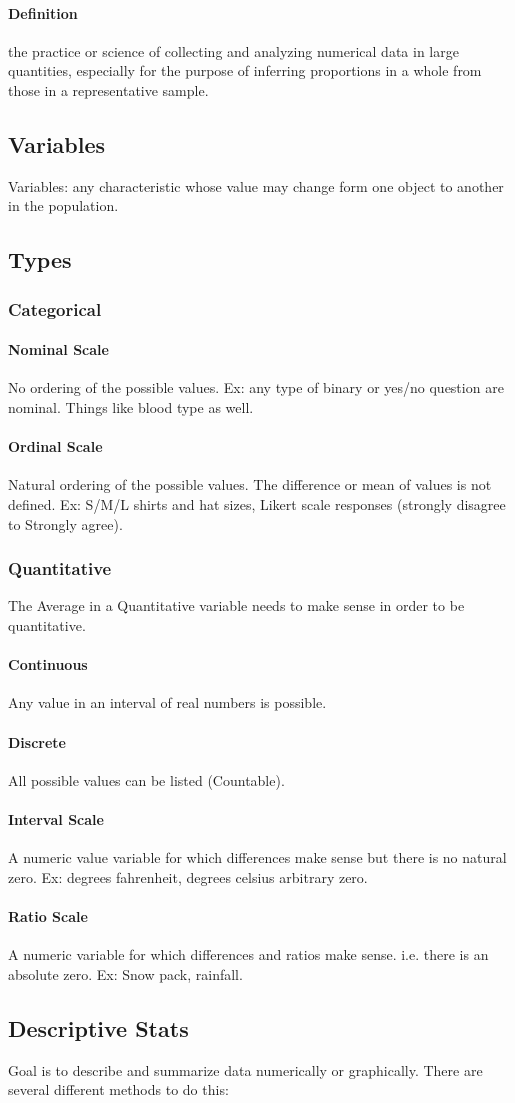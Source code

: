 \documentclass{article}
\newcommand{\p}[1]{\paragraph{#1}} %
\begin{document}
	\p{Definition}
	the practice or science of collecting and analyzing numerical data in large quantities, especially
	for the purpose of inferring proportions in a whole from those in a representative sample.
	
	\subsection{Variables}
	Variables: any characteristic whose value may change form one object to another in the population.
	\subsection{Types}
		\subsubsection{Categorical}
			\p{Nominal Scale}
			 No ordering of the possible values. Ex: any type of binary or yes/no question are
			 nominal. Things like blood type as well.
			 
			 \p{Ordinal Scale}
			 Natural ordering of the possible values. The difference or mean of values is not
			 defined. Ex: S/M/L shirts and hat sizes, Likert scale responses (strongly disagree
			 to Strongly agree).

		\subsubsection{Quantitative}
		The Average in a Quantitative variable needs to make sense in order to be quantitative.
			\p{Continuous}
			Any value in an interval of real numbers is possible.
			
			\p{Discrete}
			All possible values can be listed (Countable).
			
			\p{Interval Scale}
			A numeric value variable for which differences make sense but there is no natural
			zero. Ex: degrees fahrenheit, degrees celsius arbitrary zero.
			
			\p{Ratio Scale}
			A numeric variable for which differences and ratios make sense. i.e. there is an
			absolute zero. Ex: Snow pack, rainfall.
			
	\subsection{Descriptive Stats}
	Goal is to describe and summarize data numerically or graphically. There are several
	different methods to do this:
		
\end{document}
